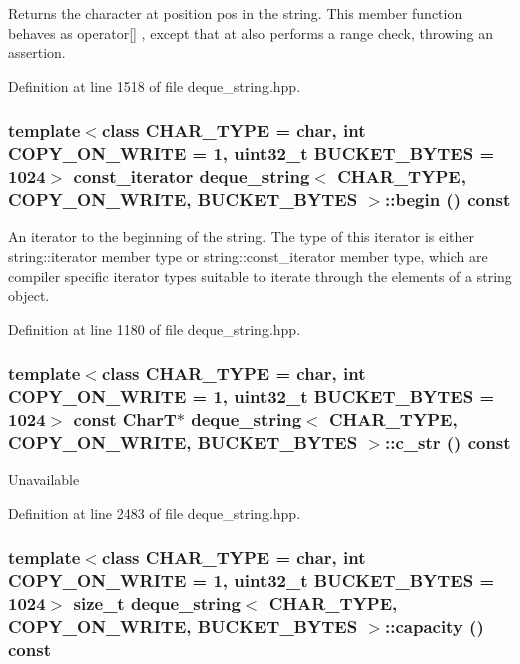 Returns the character at position pos in the string. This member function behaves as operator\mbox{[}\mbox{]} , except that at also performs a range check, throwing an assertion. 

Definition at line 1518 of file deque\_\-string.hpp.\hypertarget{classdeque__string_e7839d34819def722bdfc95900ac44cf}{
\subsubsection[{begin}]{\setlength{\rightskip}{0pt plus 5cm}template$<$class CHAR\_\-TYPE  = char, int COPY\_\-ON\_\-WRITE = 1, uint32\_\-t BUCKET\_\-BYTES = 1024$>$ const\_\-iterator {\bf deque\_\-string}$<$ CHAR\_\-TYPE, COPY\_\-ON\_\-WRITE, BUCKET\_\-BYTES $>$::begin () const}}
\label{classdeque__string_e7839d34819def722bdfc95900ac44cf}


An iterator to the beginning of the string. The type of this iterator is either string::iterator member type or string::const\_\-iterator member type, which are compiler specific iterator types suitable to iterate through the elements of a string object. 

Definition at line 1180 of file deque\_\-string.hpp.\hypertarget{classdeque__string_45faac2747ddd177516bd5d41542cdd9}{
\subsubsection[{c\_\-str}]{\setlength{\rightskip}{0pt plus 5cm}template$<$class CHAR\_\-TYPE  = char, int COPY\_\-ON\_\-WRITE = 1, uint32\_\-t BUCKET\_\-BYTES = 1024$>$ const CharT$\ast$ {\bf deque\_\-string}$<$ CHAR\_\-TYPE, COPY\_\-ON\_\-WRITE, BUCKET\_\-BYTES $>$::c\_\-str () const}}
\label{classdeque__string_45faac2747ddd177516bd5d41542cdd9}


Unavailable 

Definition at line 2483 of file deque\_\-string.hpp.\hypertarget{classdeque__string_37b3b4d907d9f7a5230c23583e88880a}{
\subsubsection[{capacity}]{\setlength{\rightskip}{0pt plus 5cm}template$<$class CHAR\_\-TYPE  = char, int COPY\_\-ON\_\-WRITE = 1, uint32\_\-t BUCKET\_\-BYTES = 1024$>$ size\_\-t {\bf deque\_\-string}$<$ CHAR\_\-TYPE, COPY\_\-ON\_\-WRITE, BUCKET\_\-BYTES $>$::capacity () const}}
\label{classdeque__string_37b3b4d907d9f7a5230c23583e88880a}


